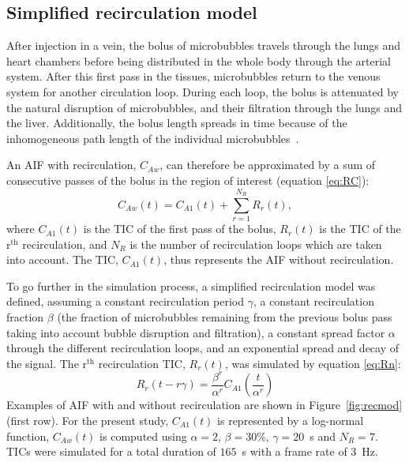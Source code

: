 \subsection{Simplified recirculation model}
After injection in a vein, the bolus of microbubbles travels through the lungs and heart chambers before being distributed in the whole body through the arterial system. After this first pass in the tissues, microbubbles return to the venous system for another circulation loop. During each loop, the bolus is attenuated by the natural disruption of microbubbles, and their filtration through the lungs and the liver. Additionally, the bolus length spreads in time because of the inhomogeneous path length of the individual microbubbles~\cite{Blomley1997ff}.

An AIF with recirculation, $C_{Aw}$, can therefore be approximated by a sum of consecutive passes of the bolus in the region of interest (equation \ref{eq:RC}): 
\begin{equation}
\label{eq:RC}
C_{Aw} \left(t\right) = C_{A1}(t) + \sum_{r=1}^{N_R} R_r \left(t\right),
\end{equation}
where $C_{A1}(t)$ is the TIC of the first pass of the bolus, $R_r(t)$ is the TIC of the r$^{\mathrm{th}}$ recirculation, and $N_R$ is the number of recirculation loops which are taken into account. The TIC, $C_{A1}(t)$, thus represents the AIF without recirculation.

To go further in the simulation process, a simplified recirculation model was defined, assuming a constant recirculation period $\gamma$, a constant recirculation fraction $\beta$ (the fraction of microbubbles remaining from the previous bolus pass taking into account bubble disruption and filtration), a constant spread factor $\alpha$ through the different recirculation loops, and an exponential spread and decay of the signal. The r$^{\mathrm{th}}$ recirculation TIC, $R_r(t)$, was simulated by equation \ref{eq:Rn}:
\begin{equation}
R_r \left( t - r \gamma \right) = \frac{\beta^r}{\alpha^r} C_{A1} \left( \frac{t }{\alpha^r} \right)
\label{eq:Rn}
\end{equation}
Examples of AIF with and without recirculation are shown in Figure~\ref{fig:recmod} (first row). For the present study, $C_{A1}(t)$ is represented by a log-normal function, $C_{Aw}(t)$ is computed using $\alpha = 2$, $\beta = 30\%$, $\gamma = 20$~s and $N_R=7$. TICs were simulated for a total duration of $165$~s with a frame rate of 3~Hz.

